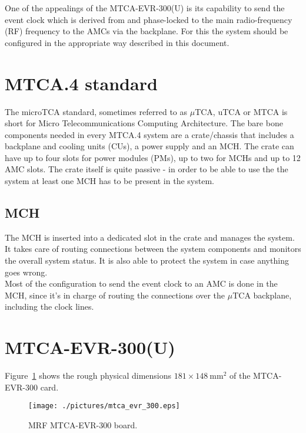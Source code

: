 \documentclass[11pt
  , a4paper
  , article
  , oneside
  , showtrims
]{memoir}
\begin{document}
One of the appealings of the MTCA-EVR-300(U) is its capability to send the event clock which is derived from and phase-locked to the main radio-frequency (RF) frequency to the AMCs via the backplane. For this the system should be configured in the appropriate way described in this document.\\

\section{MTCA.4 standard}
The microTCA standard, sometimes referred to as $\mu$TCA, uTCA or MTCA is short for Micro Telecommunications Computing Architecture. The bare bone components needed in every MTCA.4 system are a crate/chassis that includes a backplane and cooling units (CUs), a power supply and an MCH. The crate can have up to four slots for power modules (PMs), up to two for MCHs and up to 12 AMC slots. The crate itself is quite passive - in order to be able to use the the system at least one MCH has to be present in the system.\\

\subsection{MCH}
The MCH is inserted into a dedicated slot in the crate and manages the system. It takes care of routing connections between the system components and monitors the overall system status. It is also able to protect the system in case anything goes wrong.\\

Most of the configuration to send the event clock to an AMC is done in the MCH, since it's in charge of routing the connections over the $\mu$TCA backplane, including the clock lines.\\


\section{MTCA-EVR-300(U)}
Figure~\ref{fig:mtca-evr300} shows the rough physical dimensions $181\times 148~\mathrm{mm}{}^2$ of the MTCA-EVR-300 card.\\

\begin{figure}[!htb]
  \centering
  \texttt{[image: ./pictures/mtca\_evr\_300.eps]}
  \caption{
    MRF MTCA-EVR-300 board.
  }
  \label{fig:mtca-evr300}
\end{figure}
\end{document}
